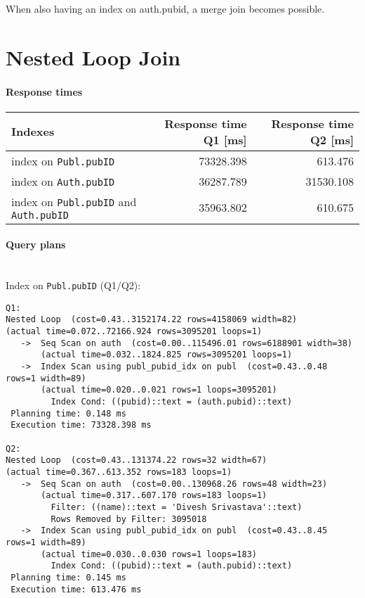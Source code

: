 \documentclass[11pt]{scrartcl}
\begin{document}
When also having an index on auth.pubid, a merge join becomes possible.

\section{Nested Loop Join}

\paragraph{Response times}

\begin{flushleft}
\begin{tabular}{l|r|r}
  Indexes & Response time Q1 [ms] & Response time Q2 [ms] \\
  \hline
  index on {\tt Publ.pubID} & 73328.398 & 613.476  \\
  index on {\tt Auth.pubID} & 36287.789 & 31530.108 \\
  index on {\tt Publ.pubID} and {\tt Auth.pubID} & 35963.802 & 610.675 \\
\end{tabular}
\end{flushleft}

\paragraph{Query plans}\mbox{}\\ 

\noindent Index on {\tt Publ.pubID} (Q1/Q2):
{\small
\begin{verbatim}
Q1:
Nested Loop  (cost=0.43..3152174.22 rows=4158069 width=82)
(actual time=0.072..72166.924 rows=3095201 loops=1)
   ->  Seq Scan on auth  (cost=0.00..115496.01 rows=6188901 width=38)
       (actual time=0.032..1824.825 rows=3095201 loops=1)
   ->  Index Scan using publ_pubid_idx on publ  (cost=0.43..0.48 rows=1 width=89)
       (actual time=0.020..0.021 rows=1 loops=3095201)
         Index Cond: ((pubid)::text = (auth.pubid)::text)
 Planning time: 0.148 ms
 Execution time: 73328.398 ms

Q2:
Nested Loop  (cost=0.43..131374.22 rows=32 width=67)
(actual time=0.367..613.352 rows=183 loops=1)
   ->  Seq Scan on auth  (cost=0.00..130968.26 rows=48 width=23)
       (actual time=0.317..607.170 rows=183 loops=1)
         Filter: ((name)::text = 'Divesh Srivastava'::text)
         Rows Removed by Filter: 3095018
   ->  Index Scan using publ_pubid_idx on publ  (cost=0.43..8.45 rows=1 width=89)
       (actual time=0.030..0.030 rows=1 loops=183)
         Index Cond: ((pubid)::text = (auth.pubid)::text)
 Planning time: 0.145 ms
 Execution time: 613.476 ms
\end{verbatim}
}
\end{document}
